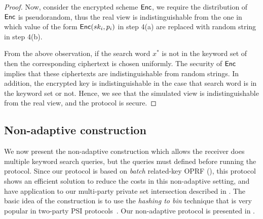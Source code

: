 \begin{proof}
Now, consider the encrypted scheme $\mathsf{Enc}$,  we require the distribution of $\mathsf{Enc}$ is pseudorandom, thus the real view is indistinguishable from the one in which value of the form  $\mathsf{Enc}(sk_i, p_i)$ in step 4(a) are replaced with random string in step 4(b). 

From the above observation, if the search word $x^*$ is not in the keyword set of \SS\, then the corresponding ciphertext is chosen uniformly. The security of $\mathsf{Enc}$ implies that these ciphertexts are indistinguishable from random strings. In addition, the encrypted key is indistinguishable in the case that search word is in the keyword set or not.  Hence, we see that the simulated view is indistinguishable from the real view, and the protocol is secure.
\end{proof}

\subsection{Non-adaptive \SSOT construction}
\label{sect:constrnSSOT}
We now present the non-adaptive \SSOT construction which allows the receiver does multiple keyword search queries, but the queries must defined before running the protocol. Since our \SSOT protocol is based on \textit{batch} related-key OPRF (\batchOPRF), this protocol shows an efficient solution to reduce the costs in this non-adaptive setting, and have application to our multi-party private set intersection described in . The basic idea of the construction is to use the \textit{hashing to bin} technique that is very popular in two-party PSI protocols~\cite{DBLP:conf/uss/Pinkas0SZ15,DBLP:conf/uss/Pinkas0Z14}. Our  non-adaptive \SSOT protocol is presented in . 


